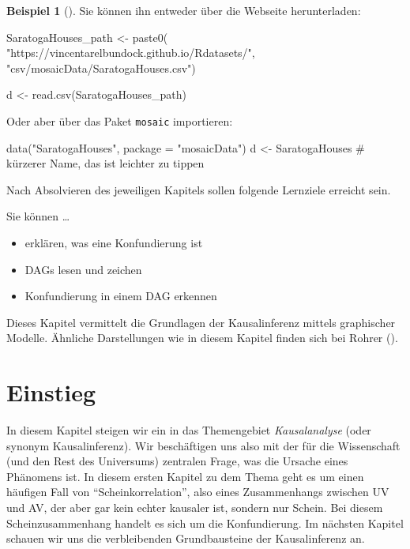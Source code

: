 \documentclass[
  ngerman,
  letterpaper,
  twoside,
  open=any]{scrbook}
\newenvironment{Shaded}{\begin{snugshade}}{\end{snugshade}}
\newcommand{\AttributeTok}[1]{\textcolor[rgb]{0.40,0.45,0.13}{#1}}
\newcommand{\CommentTok}[1]{\textcolor[rgb]{0.37,0.37,0.37}{#1}}
\newcommand{\FunctionTok}[1]{\textcolor[rgb]{0.28,0.35,0.67}{#1}}
\newcommand{\NormalTok}[1]{\textcolor[rgb]{0.00,0.23,0.31}{#1}}
\newcommand{\OtherTok}[1]{\textcolor[rgb]{0.00,0.23,0.31}{#1}}
\newcommand{\StringTok}[1]{\textcolor[rgb]{0.13,0.47,0.30}{#1}}
\providecommand{\tightlist}{%
  \setlength{\itemsep}{0pt}\setlength{\parskip}{0pt}}\usepackage{longtable,booktabs,array}
\theoremstyle{definition}
\newtheorem{example}{Beispiel}[chapter]
\theoremstyle{plain}
\theoremstyle{definition}
\theoremstyle{definition}
\theoremstyle{remark}
\begin{document}
\begin{example}[]
Sie können ihn entweder über die Webseite herunterladen:

\begin{Shaded}
\begin{Highlighting}[]
\NormalTok{SaratogaHouses\_path }\OtherTok{\textless{}{-}} \FunctionTok{paste0}\NormalTok{(}
  \StringTok{"https://vincentarelbundock.github.io/Rdatasets/"}\NormalTok{,}
  \StringTok{"csv/mosaicData/SaratogaHouses.csv"}\NormalTok{)}
  
\NormalTok{d }\OtherTok{\textless{}{-}} \FunctionTok{read.csv}\NormalTok{(SaratogaHouses\_path)}
\end{Highlighting}
\end{Shaded}

Oder aber über das Paket \texttt{mosaic} importieren:

\begin{Shaded}
\begin{Highlighting}[]
\FunctionTok{data}\NormalTok{(}\StringTok{"SaratogaHouses"}\NormalTok{, }\AttributeTok{package =} \StringTok{"mosaicData"}\NormalTok{)}
\NormalTok{d }\OtherTok{\textless{}{-}}\NormalTok{ SaratogaHouses  }\CommentTok{\# kürzerer Name, das ist leichter zu tippen}
\end{Highlighting}
\end{Shaded}

Nach Absolvieren des jeweiligen Kapitels sollen folgende Lernziele
erreicht sein.

Sie können \ldots{}

\begin{itemize}
\tightlist
\item
  erklären, was eine Konfundierung ist
\item
  DAGs lesen und zeichen
\item
  Konfundierung in einem DAG erkennen
\end{itemize}

Dieses Kapitel vermittelt die Grundlagen der Kausalinferenz mittels
graphischer Modelle. Ähnliche Darstellungen wie in diesem Kapitel finden
sich bei Rohrer ().

\section{Einstieg}\label{einstieg-3}

In diesem Kapitel steigen wir ein in das Themengebiet
\emph{Kausalanalyse} (oder synonym Kausalinferenz). Wir beschäftigen uns
also mit der für die Wissenschaft (und den Rest des Universums)
zentralen Frage, was die Ursache eines Phänomens ist. In diesem ersten
Kapitel zu dem Thema geht es um einen häufigen Fall von
\enquote{Scheinkorrelation}, also eines Zusammenhangs zwischen UV und
AV, der aber gar kein echter kausaler ist, sondern nur Schein. Bei
diesem Scheinzusammenhang handelt es sich um die Konfundierung. Im
nächsten Kapitel schauen wir uns die verbleibenden Grundbausteine der
Kausalinferenz an.


\end{example}
\end{document}
